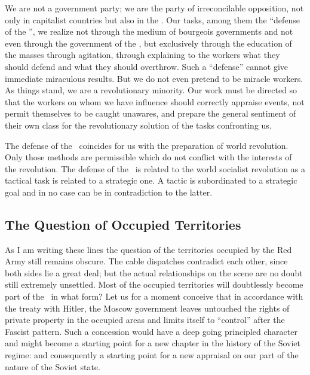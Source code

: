 We are not a government party; we are the party of irreconcilable opposition, not only in capitalist countries but also in the \USSR. Our tasks, among them the “defense of the \USSR”, we realize not through the medium of bourgeois governments and not even through the government of the \USSR, but exclusively through the education of the masses through agitation, through explaining to the workers what they should defend and what they should overthrow. Such a “defense” cannot give immediate miraculous results. But we do not even pretend to be miracle workers. As things stand, we are a revolutionary minority. Our work must be directed so that the workers on whom we have influence should correctly appraise events, not permit themselves to be caught unawares, and prepare the general sentiment of their own class for the revolutionary solution of the tasks confronting us.

The defense of the \USSR\ coincides for us with the preparation of world revolution. Only those methods are permissible which do not conflict with the interests of the revolution. The defense of the \USSR\ is related to the world socialist revolution as a tactical task is related to a strategic one. A tactic is subordinated to a strategic goal and in no case can be in contradiction to the latter.
\nowidow

\subsection*{The Question of Occupied Territories}

As I am writing these lines the question of the territories occupied by the Red Army still remains obscure. The cable dispatches contradict each other, since both sides lie a great deal; but the actual relationships on the scene are no doubt still extremely unsettled. Most of the occupied territories will doubtlessly become part of the \USSR\ in what form? Let us for a moment conceive that in accordance with the treaty with Hitler, the Moscow government leaves untouched the rights of private property in the occupied areas and limits itself to “control” after the Fascist pattern. Such a concession would have a deep going principled character and might become a starting point for a new chapter in the history of the Soviet regime: and consequently a starting point for a new appraisal on our part of the nature of the Soviet state.

